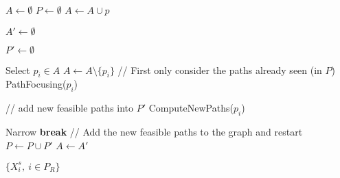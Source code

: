 \STATE $A \gets \emptyset$
\STATE $P \gets \emptyset$
	\STATE $A \gets A \cup p$
\ENDFOR

\STATE $A' \gets \emptyset$

\STATE $P' \gets \emptyset$

	\STATE Select $p_i \in A$
	\STATE $A \gets A \setminus \{p_i\}$
	\STATE // First only consider the paths already seen (in $P$)
	\STATE PathFocusing($p_i$)
	
	\STATE // add new feasible paths into $P'$
	\STATE ComputeNewPaths($p_i$)

\ENDWHILE
\STATE Narrow
	\STATE \textbf{break}
\ENDIF
\STATE // Add the new feasible paths to the graph and restart 
\STATE $P \gets P \cup P'$
\STATE $A \gets A'$
\ENDWHILE

\STATE \RETURN $\{X_i^s,\ i \in P_R\}$

